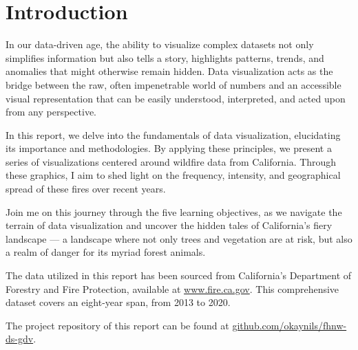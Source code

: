\chapter{Introduction}
In our data-driven age, the ability to visualize complex datasets not only simplifies information but also tells a story, highlights patterns, trends, and anomalies that might otherwise remain hidden. Data visualization acts as the bridge between the raw, often impenetrable world of numbers and an accessible visual representation that can be easily understood, interpreted, and acted upon from any perspective.

In this report, we delve into the fundamentals of data visualization, elucidating its importance and methodologies. By applying these principles, we present a series of visualizations centered around wildfire data from California. Through these graphics, I aim to shed light on the frequency, intensity, and geographical spread of these fires over recent years.

Join me on this journey through the five learning objectives, as we navigate the terrain of data visualization and uncover the hidden tales of California's fiery landscape --- a landscape where not only trees and vegetation are at risk, but also a realm of danger for its myriad forest animals.

The data utilized in this report has been sourced from California's Department of Forestry and Fire Protection, available at \href{https://fire.ca.gov/}{www.fire.ca.gov}. This comprehensive dataset covers an eight-year span, from 2013 to 2020.

The project repository of this report can be found at \href{https://github.com/okaynils/fhnw-ds-gdv}{github.com/okaynils/fhnw-ds-gdv}.